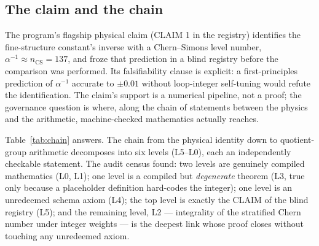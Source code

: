 
\subsection{The claim and the chain}
\label{sec:cs-claim}
The program's flagship physical claim (CLAIM 1 in the registry)
identifies the fine-structure constant's inverse with a
Chern--Simons level number, $\alpha^{-1} \approx n_{\mathrm{CS}} =
137$, and froze that prediction in a blind registry before the
comparison was performed. Its falsifiability clause is explicit:
a first-principles prediction of $\alpha^{-1}$ accurate to
$\pm 0.01$ without loop-integer self-tuning would refute the
identification. The claim's support is a numerical pipeline, not a
proof; the governance question is where, along the chain of
statements between the physics and the arithmetic, machine-checked
mathematics actually reaches.

Table~\ref{tab:chain} answers. The chain from the physical
identity down to quotient-group arithmetic decomposes into six
levels (L5--L0), each an independently checkable statement. The
audit census found: two levels are genuinely compiled mathematics
(L0, L1); one level is a compiled but \emph{degenerate} theorem
(L3, true only because a placeholder definition hard-codes the
integer); one level is an unredeemed schema axiom (L4); the top
level is exactly the CLAIM of the blind registry (L5); and the
remaining level, L2 --- integrality of the stratified Chern number
under integer weights --- is the deepest link whose proof closes
without touching any unredeemed axiom.

